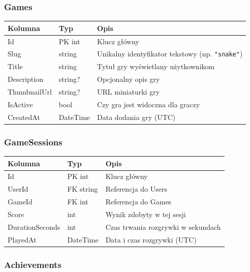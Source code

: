 \documentclass[12pt,a4paper]{article}
\begin{document}
\subsubsection{Games}

\begin{longtable}{>{\ttfamily}p{3.5cm} p{3cm} p{7cm}}
  \toprule
  \normalfont\textbf{Kolumna} & \textbf{Typ} & \textbf{Opis} \\
  \midrule
  \endhead
  Id           & PK int    & Klucz główny \\[3pt]
  Slug         & string    & Unikalny identyfikator tekstowy (np. \texttt{"snake"}) \\[3pt]
  Title        & string    & Tytuł gry wyświetlany użytkownikom \\[3pt]
  Description  & string?   & Opcjonalny opis gry \\[3pt]
  ThumbnailUrl & string?   & URL miniaturki gry \\[3pt]
  IsActive     & bool      & Czy gra jest widoczna dla graczy \\[3pt]
  CreatedAt    & DateTime  & Data dodania gry (UTC) \\
  \bottomrule
\end{longtable}

\subsubsection{GameSessions}

\begin{longtable}{>{\ttfamily}p{3.5cm} p{3cm} p{7cm}}
  \toprule
  \normalfont\textbf{Kolumna} & \textbf{Typ} & \textbf{Opis} \\
  \midrule
  \endhead
  Id              & PK int    & Klucz główny \\[3pt]
  UserId          & FK string & Referencja do Users \\[3pt]
  GameId          & FK int    & Referencja do Games \\[3pt]
  Score           & int       & Wynik zdobyty w tej sesji \\[3pt]
  DurationSeconds & int       & Czas trwania rozgrywki w sekundach \\[3pt]
  PlayedAt        & DateTime  & Data i czas rozgrywki (UTC) \\
  \bottomrule
\end{longtable}

\subsubsection{Achievements}
\end{document}
